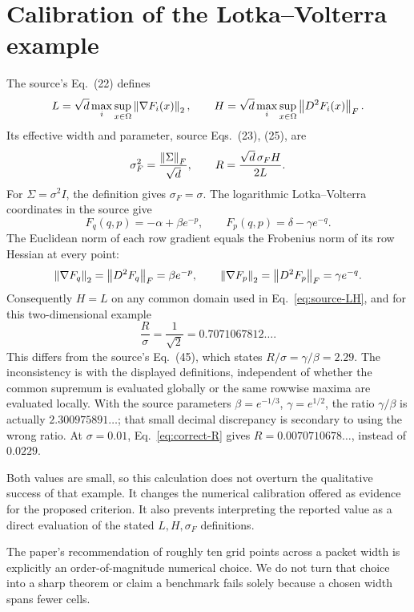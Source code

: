 \section{Calibration of the Lotka--Volterra example}
\label{sec:calibration}
The source's Eq.~(22) defines
\begin{equation}
 L=\sqrt d\max_i\sup_{x\in\Omega}\left\lVert \nabla F_i(x)\right\rVert_2,
 \qquad H=\sqrt d\max_i\sup_{x\in\Omega}\left\lVert D^2 F_i(x)\right\rVert_F.
 \label{eq:source-LH}
\end{equation}
Its effective width and parameter, source Eqs.~(23), (25), are
\begin{equation}
 \sigma_F^2=\frac{\left\lVert \Sigma\right\rVert_F}{\sqrt d},\qquad
 R=\frac{\sqrt d\,\sigma_F H}{2L}.
 \label{eq:source-R}
\end{equation}
For $\Sigma=\sigma^2 I$, the definition gives $\sigma_F=\sigma$.
The logarithmic Lotka--Volterra coordinates in the source give
\begin{equation}
 F_q(q,p)=-\alpha+\beta e^{-p},\qquad
 F_p(q,p)=\delta-\gamma e^{-q}.
 \label{eq:LV-field}
\end{equation}
The Euclidean norm of each row gradient equals the Frobenius norm of its
row Hessian at every point:
\begin{equation}
 \left\lVert \nabla F_q\right\rVert_2=\left\lVert D^2F_q\right\rVert_F=\beta e^{-p},\qquad
 \left\lVert \nabla F_p\right\rVert_2=\left\lVert D^2F_p\right\rVert_F=\gamma e^{-q}.
\end{equation}
Consequently $H=L$ on any common domain used in
Eq.~\eqref{eq:source-LH}, and for this two-dimensional example
\begin{equation}
 \frac R\sigma=\frac{1}{\sqrt2}=0.7071067812\ldots.
 \label{eq:correct-R}
\end{equation}
This differs from the source's Eq.~(45), which states
$R/\sigma=\gamma/\beta=2.29$. The inconsistency is with the displayed
definitions, independent of whether the common supremum is evaluated globally
or the same rowwise maxima are evaluated locally. With the source parameters
$\beta=e^{-1/3}$, $\gamma=e^{1/2}$, the ratio $\gamma/\beta$ is actually
$2.300975891\ldots$; that small decimal discrepancy is secondary to using the
wrong ratio. At $\sigma=0.01$, Eq.~\eqref{eq:correct-R} gives
$R=0.0070710678\ldots$, instead of $0.0229$.

Both values are small, so this calculation does not overturn the qualitative
success of that example. It changes the numerical calibration offered as
evidence for the proposed criterion. It also prevents interpreting the
reported value as a direct evaluation of the stated $L,H,\sigma_F$ definitions.

The paper's recommendation of roughly ten grid points across a packet width
is explicitly an order-of-magnitude numerical choice. We do not turn that
choice into a sharp theorem or claim a benchmark fails solely because a
chosen width spans fewer cells.
